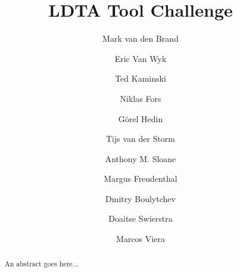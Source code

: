 \documentclass[english,preprint,12pt]{elsarticle}
\begin{document}
\begin{frontmatter}



\title{LDTA Tool Challenge}


\author[tue]{Mark van den Brand}


\author[umn]{Eric Van Wyk}
\author[umn]{Ted Kaminski}

\author[lu]{Niklas Fors}
\author[lu]{G{\"o}rel Hedin}
\author[cwi]{Tijs van der Storm}

\author[mq]{Anthony M. Sloane}

\author[cy]{Margus Freudenthal}

\author[spbu]{Dmitry Boulytchev}

\author[uu]{Doaitse Swierstra}

\author[udelar]{Marcos Viera}


\address[tue]{Technical University of Eindhoven, Eindhoven, The Netherlands}
\address[umn]{University of Minnesota, Minneapolis, MN, United States}
\address[lu]{Lund University, Lund, Sweden}
\address[mq]{Macquarie University, Sydney, Australia}
\address[cy]{Cybernetica AS / University of Tartu, Tartu, Estonia}
\address[spbu]{St-Petersburg State University, St.Petersburg, Russia}
\address[cwi]{Centrum Wiskunde \&\ Informatica, Amsterdam, The Netherlands}
\address[uu]{Utrecht University, Utrecht, The Netherlands}
\address[udelar]{University of the Republic, Montevideo, Uruguay}

\begin{abstract}

An abstract goes here...

\end{abstract}

\begin{keyword}


\end{keyword}

\end{frontmatter}
\end{document}
